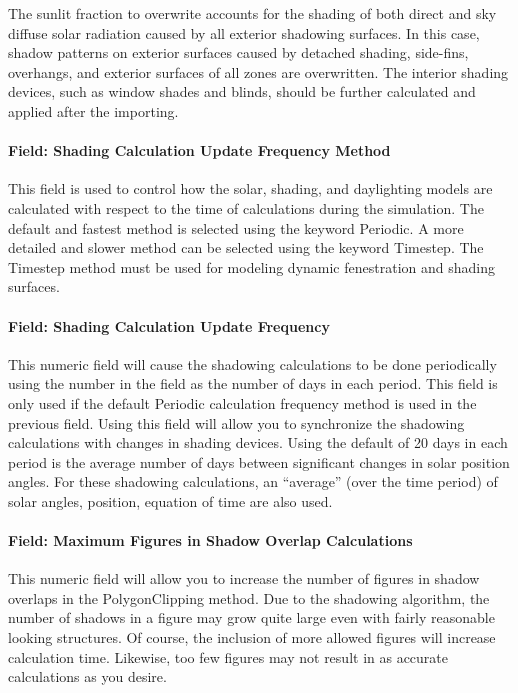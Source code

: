 The sunlit fraction to overwrite accounts for the shading of both direct and sky diffuse solar radiation caused by all exterior shadowing surfaces. In this case, shadow patterns on exterior surfaces caused by detached shading, side-fins, overhangs, and exterior surfaces of all zones are overwritten. The interior shading devices, such as window shades and blinds, should be further calculated and applied after the importing.

\paragraph{Field: Shading Calculation Update Frequency Method}\label{field-calculation-method-000}

This field is used to control how the solar, shading, and daylighting models are calculated with respect to the time of calculations during the simulation. The default and fastest method is selected using the keyword Periodic. A more detailed and slower method can be selected using the keyword Timestep. The Timestep method must be used for modeling dynamic fenestration and shading surfaces.

\paragraph{Field: Shading Calculation Update Frequency}\label{field-calculation-frequency}

This numeric field will cause the shadowing calculations to be done periodically using the number in the field as the number of days in each period. This field is only used if the default Periodic calculation frequency method is used in the previous field. Using this field will allow you to synchronize the shadowing calculations with changes in shading devices. Using the default of 20 days in each period is the average number of days between significant changes in solar position angles. For these shadowing calculations, an ``average'' (over the time period) of solar angles, position, equation of time are also used.

\paragraph{Field: Maximum Figures in Shadow Overlap Calculations}\label{field-maximum-figures-in-shadow-overlap-calculations}

This numeric field will allow you to increase the number of figures in shadow overlaps in the PolygonClipping method. Due to the shadowing algorithm, the number of shadows in a figure may grow quite large even with fairly reasonable looking structures. Of course, the inclusion of more allowed figures will increase calculation time. Likewise, too few figures may not result in as accurate calculations as you desire.

